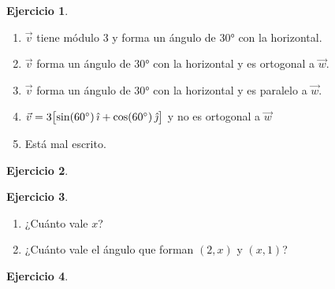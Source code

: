 \documentclass[a4paper,12pt,twoside]{book}
\newtheorem{ejercicio}{{Ejercicio}}[chapter]
\begin{document}
\begin{mdframed}[style=ejercicio-facil]
    \begin{ejercicio}
    \end{ejercicio}
    \begin{enumerate}
        \item $\vec{v}$ tiene módulo 3 y forma un ángulo de $\ang{30}$ con la horizontal.
        \item $\vec{v}$ forma un ángulo de $\ang{30}$ con la horizontal y es ortogonal a $\vec{w}$.
        \item $\vec{v}$ forma un ángulo de $\ang{30}$ con la horizontal y es paralelo a $\vec{w}$.
        \item $\vec{v} = 3 { \begin{bmatrix} \sin(\ang{60}) \, \hat{\imath} + \cos(\ang{60}) \, \hat{\jmath} \end{bmatrix} }$ y no es ortogonal a $\vec{w}$
        \item Está mal escrito.
    \end{enumerate}
\end{mdframed}

\begin{mdframed}[style=ejercicio-facil]
    \begin{ejercicio}
    \end{ejercicio}
\end{mdframed}

\begin{mdframed}[style=ejercicio-facil]
    \begin{ejercicio}
    \end{ejercicio}
    \begin{enumerate}
        \item ¿Cuánto vale $x$?
        \item ¿Cuánto vale el ángulo que forman $(2,x)$ y $(x,1)$?
    \end{enumerate}
\end{mdframed}

\begin{mdframed}[style=ejercicio-facil]
    \begin{ejercicio}
    \end{ejercicio}
\end{mdframed}
\end{document}
